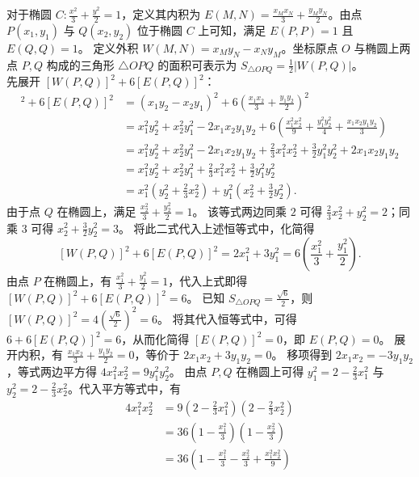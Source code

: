 \begin{solution}
对于椭圆 $C: \frac{x^2}{3} + \frac{y^2}{2} = 1$，定义其内积为 $E(M, N) = \frac{x_M x_N}{3} + \frac{y_M y_N}{2}$。由点 $P(x_1, y_1)$ 与 $Q(x_2, y_2)$ 位于椭圆 $C$ 上可知，满足 $E(P,P) = 1$ 且 $E(Q,Q) = 1$。
定义外积 $W(M, N) = x_M y_N - x_N y_M$。坐标原点 $O$ 与椭圆上两点 $P, Q$ 构成的三角形 $\triangle OPQ$ 的面积可表示为 $S_{\triangle OPQ} = \frac{1}{2} |W(P, Q)|$。\\
先展开 $[W(P,Q)]^2+6[E(P,Q)]^2$：
\begin{align*}
[W(P, Q)]^2 + 6 [E(P, Q)]^2 &= (x_1 y_2 - x_2 y_1)^2 + 6 \left( \frac{x_1 x_2}{3} + \frac{y_1 y_2}{2} \right)^2 \\
&= x_1^2 y_2^2 + x_2^2 y_1^2 - 2x_1 x_2 y_1 y_2 + 6 \left( \frac{x_1^2 x_2^2}{9} + \frac{y_1^2 y_2^2}{4} + \frac{x_1 x_2 y_1 y_2}{3} \right) \\
&= x_1^2 y_2^2 + x_2^2 y_1^2 - 2x_1 x_2 y_1 y_2 + \frac{2}{3} x_1^2 x_2^2 + \frac{3}{2} y_1^2 y_2^2 + 2x_1 x_2 y_1 y_2 \\
&= x_1^2 y_2^2 + x_2^2 y_1^2 + \frac{2}{3} x_1^2 x_2^2 + \frac{3}{2} y_1^2 y_2^2 \\
&= x_1^2 \left( y_2^2 + \frac{2}{3} x_2^2 \right) + y_1^2 \left( x_2^2 + \frac{3}{2} y_2^2 \right).
\end{align*}
由于点 $Q$ 在椭圆上，满足 $\frac{x_2^2}{3} + \frac{y_2^2}{2} = 1$。
该等式两边同乘 $2$ 可得 $\frac{2}{3} x_2^2 + y_2^2 = 2$；同乘 $3$ 可得 $x_2^2 + \frac{3}{2} y_2^2 = 3$。
将此二式代入上述恒等式中，化简得
\[
[W(P, Q)]^2 + 6 [E(P, Q)]^2 = 2x_1^2 + 3y_1^2 = 6 \left( \frac{x_1^2}{3} + \frac{y_1^2}{2} \right).
\]
由点 $P$ 在椭圆上，有 $\frac{x_1^2}{3} + \frac{y_1^2}{2} = 1$，代入上式即得 $[W(P, Q)]^2 + 6 [E(P, Q)]^2 = 6$。
已知 $S_{\triangle OPQ} = \frac{\sqrt{6}}{2}$，则 $[W(P, Q)]^2 = 4 \left(\frac{\sqrt{6}}{2}\right)^2 = 6$。
将其代入恒等式中，可得 $6 + 6 [E(P, Q)]^2 = 6$，从而化简得 $[E(P, Q)]^2 = 0$，即 $E(P, Q) = 0$。
展开内积，有 $\frac{x_1 x_2}{3} + \frac{y_1 y_2}{2} = 0$，等价于 $2x_1 x_2 + 3y_1 y_2 = 0$。
移项得到 $2x_1 x_2 = -3y_1 y_2$，等式两边平方得 $4x_1^2 x_2^2 = 9y_1^2 y_2^2$。
由点 $P, Q$ 在椭圆上可得 $y_1^2 = 2 - \frac{2}{3} x_1^2$ 与 $y_2^2 = 2 - \frac{2}{3} x_2^2$。代入平方等式中，有
\begin{align*}
4x_1^2 x_2^2 &= 9 \left( 2 - \frac{2}{3} x_1^2 \right) \left( 2 - \frac{2}{3} x_2^2 \right) \\
&= 36 \left( 1 - \frac{x_1^2}{3} \right) \left( 1 - \frac{x_2^2}{3} \right) \\
&= 36 \left( 1 - \frac{x_1^2}{3} - \frac{x_2^2}{3} + \frac{x_1^2 x_2^2}{9} \right) \\

\end{align*}
\end{solution}
